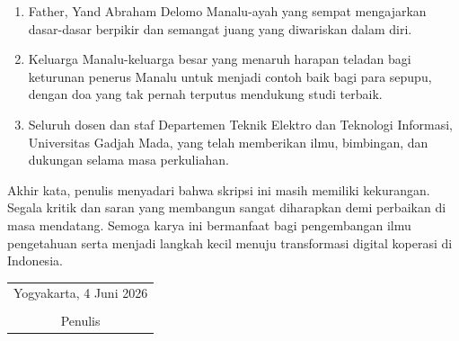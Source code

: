 \begin{enumerate}[leftmargin=*]
	\item Father, Yand Abraham Delomo Manalu-ayah yang sempat mengajarkan dasar-dasar berpikir dan semangat juang yang diwariskan dalam diri.
	
	\item Keluarga Manalu-keluarga besar yang menaruh harapan teladan bagi keturunan penerus Manalu untuk menjadi contoh baik bagi para sepupu, dengan doa yang tak pernah terputus mendukung studi terbaik.
	
	\item Seluruh dosen dan staf Departemen Teknik Elektro dan Teknologi Informasi, Universitas Gadjah Mada, yang telah memberikan ilmu, bimbingan, dan dukungan selama masa perkuliahan.
\end{enumerate}

Akhir kata, penulis menyadari bahwa skripsi ini masih memiliki kekurangan. Segala kritik dan saran yang membangun sangat diharapkan demi perbaikan di masa mendatang. Semoga karya ini bermanfaat bagi pengembangan ilmu pengetahuan serta menjadi langkah kecil menuju transformasi digital koperasi di Indonesia.

\begin{flushright}
	\begin{tabular}{c}
		Yogyakarta, 4 Juni 2026 \\
		\vspace{1cm} \\
		Penulis
	\end{tabular}
\end{flushright}
